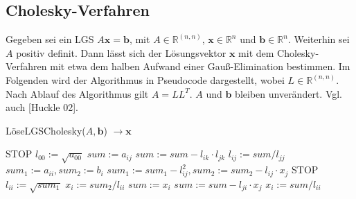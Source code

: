 \subsection{Cholesky-Verfahren}
\label{anhang_b_cholesky}
Gegeben sei ein LGS $A\bm{x} = \bm{b}$, mit $A \in \mathbb{R}^{(n, n)}$, $\bm{x} \in \mathbb{R}^n$ und $\bm{b} \in \mathbb{R}^n$. Weiterhin sei $A$ positiv definit. Dann lässt sich der Lösungsvektor $\bm{x}$ mit dem Cholesky-Verfahren mit etwa dem halben Aufwand einer Gauß-Elimination bestimmen. Im Folgenden wird der Algorithmus in Pseudocode dargestellt, wobei $L \in \mathbb{R}^{(n,n)}$. Nach Ablauf des Algorithmus gilt $A = LL^T$. $A$ und $\bm{b}$ bleiben unverändert. Vgl. auch [Huckle 02].
\begin{algorithm}
\caption{LöseLGSCholesky($A, \textbf{b}$) $\rightarrow \bm{x}$}
\label{cholesky}
\begin{algorithmic}
{\small
{}
    \STATE STOP 
\ENDIF
\STATE
\STATE $l_{00} := \sqrt{a_{00}}$
\STATE
{}
    \STATE $sum := a_{ij}$
        \STATE $sum := sum - l_{ik} \cdot l_{jk}$
    \ENDFOR
    \STATE $l_{ij} := sum / l_{jj}$
  \ENDFOR
  \STATE
  \STATE $sum_1 := a_{ii}, sum_2 := b_i$
  \STATE
    \STATE $sum_1 := sum_1 - l_{ij}^2, sum_2 := sum_2 - l_{ij} \cdot x_j$
  \ENDFOR
  \STATE
    \STATE STOP 
  \ENDIF
  \STATE
  \STATE $l_{ii} := \sqrt{sum_1}$
  \STATE $x_{i} := sum_2 / l_{ii}$
\ENDFOR
\STATE
{}
  \STATE $sum := x_i$
    \STATE $sum := sum - l_{ji} \cdot x_j$
  \ENDFOR
  \STATE $x_i := sum / l_{ii}$
\ENDFOR
}
\end{algorithmic}
\end{algorithm}

